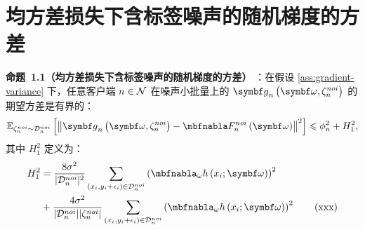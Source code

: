 \section{均方差损失下含标签噪声的随机梯度的方差}\label{app:pro1}
\noindent \textbf{命题~1.1（均方差损失下含标签噪声的随机梯度的方差）}
：在假设 \ref{ass:gradient-variance} 下，任意客户端 $n\in\mathcal{N}$ 在噪声小批量上的 $\gb_n\left(\omegab,\zetanoi_n\right)$ 的期望方差是有界的：
\begin{equation}\label{bounded-variance with noise}
     \mathbb{E}_{\zetanoi_n\sim \Dnoi_n}\left[\left\Vert \gb_n\left(\boldsymbol{\omega},\zetanoi_n\right) - \nabla \fnoi_n\left(\boldsymbol{\omega}\right) \right\Vert^2 \right] \leq \phi_n^2+H_1^2,
\end{equation}
其中 $H_1^2$ 定义为：
\begin{align}\label{eq:H}
    H_1^2 &= \frac{8\sigma^2}{|\mathcal{D}_n^{noi}|^2}\sum_{\left(x_{i},y_{i}+\epsilon_{i}\right)\in \mathcal{D}_n^{noi}}\left(
\nabla_\omega  h\left(x_{i};\boldsymbol{\omega}\right)\right)^2 \notag\\
    &+\frac{4\sigma^2}{|\mathcal{D}_n^{noi}||\zeta_n^{noi}|}\sum_{\left(x_{i},y_{i}+\epsilon_{i}\right)\in \mathcal{D}_n^{noi}}\left(
\nabla_\omega  h\left(x_{i};\boldsymbol{\omega}\right)\right)^2
\tag{xxx}
\end{align}
